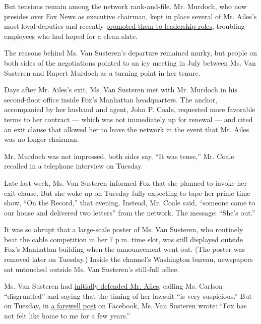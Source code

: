 But tensions remain among the network rank-and-file. Mr. Murdoch, who
now presides over Fox News as executive chairman, kept in place several
of Mr. Ailes's most loyal deputies and recently
\href{http://www.nytimes3xbfgragh.onion/2016/08/13/business/media/fox-news-leadership.html}{promoted
them to leadership roles}, troubling employees who had hoped for a clean
slate.

The reasons behind Ms. Van Susteren's departure remained murky, but
people on both sides of the negotiations pointed to an icy meeting in
July between Ms. Van Susteren and Rupert Murdoch as a turning point in
her tenure.

Days after Mr. Ailes's exit, Ms. Van Susteren met with Mr. Murdoch in
his second-floor office inside Fox's Manhattan headquarters. The anchor,
accompanied by her husband and agent, John P. Coale, requested more
favorable terms to her contract --- which was not immediately up for
renewal --- and cited an exit clause that allowed her to leave the
network in the event that Mr. Ailes was no longer chairman.

Mr. Murdoch was not impressed, both sides say. ``It was tense,'' Mr.
Coale recalled in a telephone interview on Tuesday.

Late last week, Ms. Van Susteren informed Fox that she planned to invoke
her exit clause. But she woke up on Tuesday fully expecting to tape her
prime-time show, ``On the Record,'' that evening. Instead, Mr. Coale
said, ``someone came to our house and delivered two letters'' from the
network. The message: ``She's out.''

It was so abrupt that a large-scale poster of Ms. Van Susteren, who
routinely beat the cable competition in her 7 p.m. time slot, was still
displayed outside Fox's Manhattan building when the announcement went
out. (The poster was removed later on Tuesday.) Inside the channel's
Washington bureau, newspapers sat untouched outside Ms. Van Susteren's
still-full office.

Ms. Van Susteren had
\href{http://www.nytimes3xbfgragh.onion/2016/07/08/business/media/gretchen-carlson-suit-against-fox-news-head-forces-network-to-face-changing-mores.html}{initially
defended Mr. Ailes}, calling Ms. Carlson ``disgruntled'' and saying that
the timing of her lawsuit ``is very suspicious.'' But on Tuesday, in
\href{https://www.facebookcorewwwi.onion/greta/photos/a.162242790457256.36266.158671177481084/1423804617634394/?type=3\&theater}{a
farewell post} on Facebook, Ms. Van Susteren wrote: ``Fox has not felt
like home to me for a few years.''

